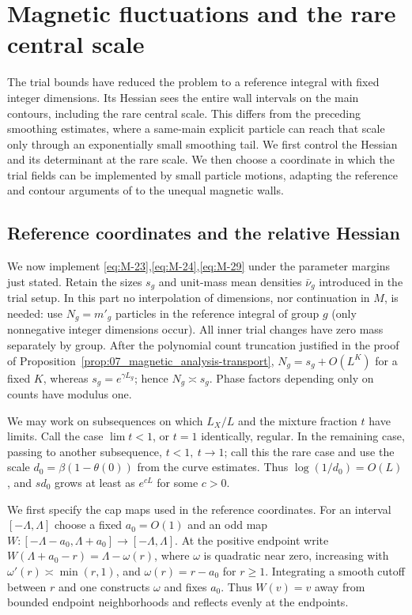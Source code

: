 \section{Magnetic fluctuations and the rare central scale}
\label{sec:07_magnetic_analysis-fluctuations}

The trial bounds have reduced the problem to a reference integral with
fixed integer dimensions. Its Hessian sees the entire wall intervals
on the main contours, including the rare central scale. This differs from the preceding
smoothing estimates, where a same-main explicit particle can reach that
scale only through an exponentially small smoothing tail. We first
control the Hessian and its determinant at the rare scale. We then
choose a coordinate in which the trial fields can be implemented by
small particle motions, adapting the reference and contour arguments
of \cite{Electric} to the unequal magnetic walls.

\subsection{Reference coordinates and the relative Hessian}

We now implement \eqref{eq:M-23},\eqref{eq:M-24},\eqref{eq:M-29} under the parameter margins just stated. Retain the sizes $s_g$ and unit-mass mean densities $\bar\nu_g$ introduced in the trial setup. In this part no interpolation of dimensions, nor continuation in \(M\), is needed: use \(N_g=m'_g\) particles in the reference integral of group \(g\) (only nonnegative integer dimensions occur). All inner trial changes have zero mass separately by group. After the
polynomial count truncation justified in the proof of
Proposition~\ref{prop:07_magnetic_analysis-transport},
\(N_g=s_g+O(L^K)\) for a fixed \(K\), whereas
\(s_g=e^{\gamma L_g}\); hence \(N_g\asymp s_g\).
Phase factors depending only on counts have modulus one.

We may work on subsequences on which \(L_X/L\) and the mixture fraction \(t\) have limits. Call the case \(\lim t<1\), or \(t=1\) identically, regular. In the remaining case, passing to another subsequence, \(t<1,\ t\to1\); call this the rare case and use the scale \(d_0=\beta(1-\theta(0))\) from the curve estimates. Thus \(\log(1/d_0)=O(L)\), and \(s d_0\) grows at least as \(e^{cL}\) for some \(c>0\).

We first specify the cap maps used in the reference coordinates.
For an interval $[-\Lambda,\Lambda]$ choose a fixed $a_0=O(1)$
and an odd map $W:[-\Lambda-a_0,\Lambda+a_0]\to[-\Lambda,\Lambda]$.
At the positive endpoint write
$W(\Lambda+a_0-r)=\Lambda-\omega(r)$, where $\omega$ is quadratic
near zero, increasing with $\omega'(r)\asymp\min(r,1)$, and
$\omega(r)=r-a_0$ for $r\ge1$. Integrating a smooth cutoff between
$r$ and one constructs $\omega$ and fixes $a_0$. Thus $W(v)=v$
away from bounded endpoint neighborhoods and reflects evenly at the
endpoints.

